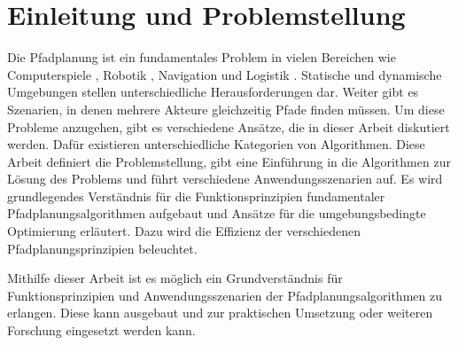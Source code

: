 \chapter{Einleitung und Problemstellung}

Die Pfadplanung ist ein fundamentales Problem in vielen Bereichen wie Computerspiele \cite{Krishnaswamy.2009}, Robotik \cite{latombe}, Navigation und Logistik \cite{Botea.2011}. Statische und dynamische Umgebungen stellen unterschiedliche Herausforderungen dar. Weiter gibt es Szenarien, in denen mehrere Akteure gleichzeitig Pfade finden müssen. Um diese Probleme anzugehen, gibt es verschiedene Ansätze, die in dieser Arbeit diskutiert werden. Dafür existieren unterschiedliche Kategorien von Algorithmen. Diese Arbeit definiert die Problemstellung, gibt eine Einführung in die Algorithmen zur Lösung des Problems und führt verschiedene Anwendungsszenarien auf. Es wird grundlegendes Verständnis für die Funktionsprinzipien fundamentaler Pfadplanungsalgorithmen aufgebaut und Ansätze für die umgebungsbedingte Optimierung erläutert. Dazu wird die Effizienz der verschiedenen Pfadplanungsprinzipien beleuchtet.




Mithilfe dieser Arbeit ist es möglich ein Grundverständnis für Funktionsprinzipien und Anwendungsszenarien der Pfadplanungsalgorithmen zu erlangen. Diese kann ausgebaut und zur praktischen
Umsetzung oder weiteren Forschung eingesetzt werden kann.

